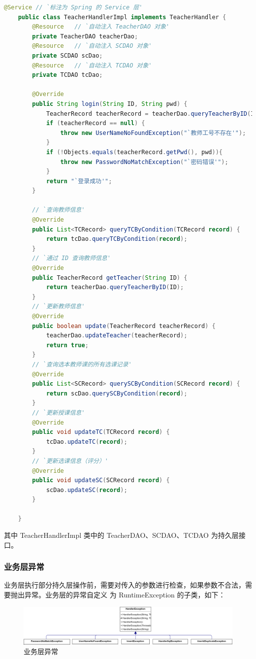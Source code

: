 \documentclass[12pt, a4paper]{article}
\begin{document}
\begin{lstlisting}[language = Java]
	@Service // `标注为 Spring 的 Service 层'
	public class TeacherHandlerImpl implements TeacherHandler {
		@Resource	// `自动注入 TeacherDAO 对象'
		private TeacherDAO teacherDao;
		@Resource	// `自动注入 SCDAO 对象'
		private SCDAO scDao;
		@Resource	// `自动注入 TCDAO 对象'
		private TCDAO tcDao;
	
		@Override
		public String login(String ID, String pwd) {
			TeacherRecord teacherRecord = teacherDao.queryTeacherByID(ID);
			if (teacherRecord == null) {
				throw new UserNameNoFoundException("`教师工号不存在'");
			}
			if (!Objects.equals(teacherRecord.getPwd(), pwd)){
				throw new PasswordNoMatchException("`密码错误'");
			}
			return "`登录成功'";
		}
	
		// `查询教师信息'
		@Override
		public List<TCRecord> queryTCByCondition(TCRecord record) {
			return tcDao.queryTCByCondition(record);
		}
		// `通过 ID 查询教师信息'
		@Override
		public TeacherRecord getTeacher(String ID) {
			return teacherDao.queryTeacherByID(ID);
		}
	 	// `更新教师信息'
		@Override
		public boolean update(TeacherRecord teacherRecord) {
			teacherDao.updateTeacher(teacherRecord);
			return true;
		}
		// `查询选本教师课的所有选课记录'
		@Override
		public List<SCRecord> querySCByCondition(SCRecord record) {
			return scDao.querySCByCondition(record);
		}
		// `更新授课信息'
		@Override
		public void updateTC(TCRecord record) {
			tcDao.updateTC(record);
		}
		// `更新选课信息（评分）'
		@Override
		public void updateSC(SCRecord record) {
			scDao.updateSC(record);
		}
	
	}
\end{lstlisting}
其中 TeacherHandlerImpl 类中的 TeacherDAO、SCDAO、TCDAO 为持久层接口。
\subsubsection{业务层异常}
业务层执行部分持久层操作前，需要对传入的参数进行检查，如果参数不合法，需要抛出异常。业务层的异常自定义
为 RuntimeException 的子类，如下：
\begin{figure}[H]
	\centering
	\includegraphics[width = 0.9 \textwidth]{HandlerException.png}
	\caption{业务层异常}
\end{figure}
\end{document}
